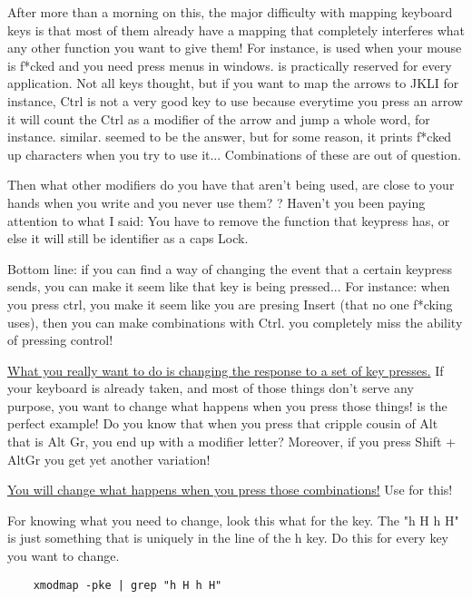 \par After more than a morning on this, the major difficulty with mapping keyboard keys is that most of them already have a mapping that completely interferes what any other function you want to give them! For instance,  is used when your mouse is f*cked and you need press menus in windows.  is practically reserved for every application. Not all keys thought, but if you want to map the arrows to JKLI for instance, Ctrl is not a very good key to use because everytime you press an arrow it will count the Ctrl as a modifier of the arrow and jump a whole word, for instance.  similar.  seemed to be the answer, but for some reason, it prints f*cked up characters when you try to use it... Combinations of these are out of question. 

\par Then what other modifiers do you have that aren't being used, are close to your hands when you write and you never use them? ? Haven't you been paying attention to what I said: You have to remove the function that keypress has, or else it will still be identifier as a caps Lock.

\par Bottom line: if you can find a way of changing the event that a certain keypress sends, you can make it seem like that key is being pressed... For instance: when you press ctrl, you make it seem like you are presing Insert (that no one f*cking uses), then you can make combinations with Ctrl.  you completely miss the ability of pressing control!

\par \uline{What you really want to do is changing the response to a set of key presses.} If your keyboard is already taken, and most of those things don't serve any purpose, you want to change what happens when you press those things!  is the perfect example! Do you know that when you press that cripple cousin of Alt that is Alt Gr, you end up with a modifier letter? Moreover, if you press Shift + AltGr you get yet another variation! 

\par \ul{You will change what happens when you press those combinations!} Use  for this!

\vspace{.5cm}
For knowing what you need to change, look this what for the key. The "h H h H" is just something that is uniquely in the line of the h key. Do this for every key you want to change.
\begin{lstlisting}
    xmodmap -pke | grep "h H h H"  
\end{lstlisting}


